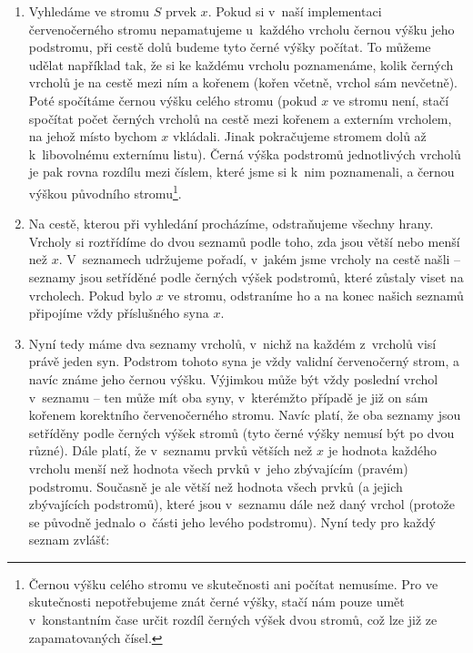 \begin{enumerate}

\item Vyhledáme ve stromu $S$ prvek $x$. Pokud si v~naší implementaci
červenočerného stromu nepamatujeme u~každého vrcholu černou výšku jeho
podstromu, při cestě dolů budeme tyto černé výšky počítat. To můžeme udělat
například tak, že si ke každému vrcholu poznamenáme, kolik černých vrcholů je
na cestě mezi ním a kořenem (kořen včetně, vrchol sám nevčetně). Poté spočítáme
černou výšku celého stromu (pokud $x$ ve stromu není, stačí spočítat počet
černých vrcholů na cestě mezi kořenem a externím vrcholem, na jehož místo
bychom $x$ vkládali. Jinak pokračujeme stromem dolů až k~libovolnému externímu
listu). Černá výška podstromů jednotlivých vrcholů je pak rovna rozdílu mezi číslem,
které jsme si k~nim poznamenali, a černou výškou původního
stromu\footnote{Černou výšku celého stromu ve skutečnosti ani počítat nemusíme.
Pro  ve skutečnosti nepotřebujeme znát černé výšky, stačí nám pouze umět
v~konstantním čase určit rozdíl černých výšek dvou stromů, což lze již ze
zapamatovaných čísel.}.

\item Na cestě, kterou při vyhledání procházíme, odstraňujeme všechny hrany.
Vrcholy si roztřídíme do dvou seznamů podle toho, zda jsou větší nebo menší než
$x$. V~seznamech udržujeme pořadí, v~jakém jsme vrcholy na cestě našli --
seznamy jsou setříděné podle černých výšek podstromů, které zůstaly viset na
vrcholech. Pokud bylo $x$ ve stromu, odstraníme ho a na konec našich seznamů
připojíme vždy příslušného syna $x$.

\item Nyní tedy máme dva seznamy vrcholů, v~nichž na každém z~vrcholů visí
právě jeden syn. Podstrom tohoto syna je vždy validní červenočerný strom, a
navíc známe jeho černou výšku. Výjimkou může být vždy poslední vrchol v~seznamu
-- ten může mít oba syny, v~kterémžto případě je již on sám kořenem korektního
červenočerného stromu. Navíc platí, že oba seznamy jsou setříděny podle černých
výšek stromů (tyto černé výšky nemusí být po dvou různé). Dále platí, že
v~seznamu prvků větších než $x$ je hodnota každého vrcholu menší než hodnota všech
prvků v~jeho zbývajícím (pravém) podstromu. Současně je ale větší než hodnota všech prvků
(a jejich zbývajících podstromů), které jsou v~seznamu dále než daný vrchol (protože se
původně jednalo o~části jeho levého podstromu). Nyní tedy pro každý seznam
zvlášť:
\begin{itemize}


\end{itemize}
\end{enumerate}

